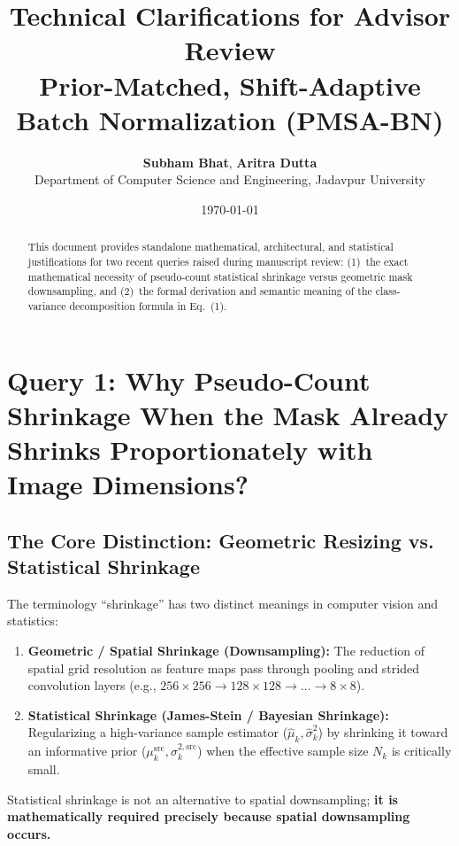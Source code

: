 \documentclass[11pt,a4paper]{article}
\title{\textbf{Technical Clarifications for Advisor Review}\\
\large Prior-Matched, Shift-Adaptive Batch Normalization (PMSA-BN)}
\author{\textbf{Subham Bhat}, \textbf{Aritra Dutta}\\
Department of Computer Science and Engineering, Jadavpur University}
\date{\today}
\begin{document}
\maketitle

\begin{abstract}
This document provides standalone mathematical, architectural, and statistical justifications for two recent queries raised during manuscript review: (1)~the exact mathematical necessity of pseudo-count statistical shrinkage versus geometric mask downsampling, and (2)~the formal derivation and semantic meaning of the class-variance decomposition formula in Eq.~(1).
\end{abstract}

\vspace{1em}

\section{Query 1: Why Pseudo-Count Shrinkage When the Mask Already Shrinks Proportionately with Image Dimensions?}

\subsection{The Core Distinction: Geometric Resizing vs. Statistical Shrinkage}
The terminology ``shrinkage'' has two distinct meanings in computer vision and statistics:
\begin{enumerate}
    \item \textbf{Geometric / Spatial Shrinkage (Downsampling):} The reduction of spatial grid resolution as feature maps pass through pooling and strided convolution layers (e.g., $256 \times 256 \to 128 \times 128 \to \dots \to 8 \times 8$).
    \item \textbf{Statistical Shrinkage (James-Stein / Bayesian Shrinkage):} Regularizing a high-variance sample estimator ($\hat{\mu}_k, \hat{\sigma}^2_k$) by shrinking it toward an informative prior ($\mu_k^{\mathrm{src}}, \sigma_k^{2,\mathrm{src}}$) when the effective sample size $N_k$ is critically small.
\end{enumerate}

\begin{tcolorbox}[title=Key Insight]
Statistical shrinkage is not an alternative to spatial downsampling; \textbf{it is mathematically required precisely because spatial downsampling occurs.}
\end{tcolorbox}
\end{document}
